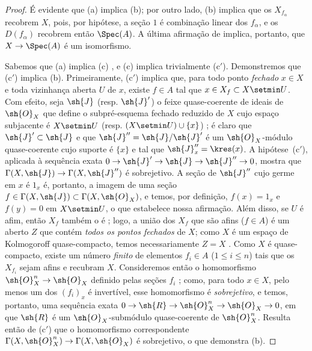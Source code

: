 \documentclass[oneside,10pt]{amsart}
\makeatletter
\renewcommand{\leq}{\leqslant}
\newcommand{\ega@arrow}[2]{\mathchoice{#1}{#2}{#2}{#2}}
\renewcommand{\to}{\ega@arrow{\longrightarrow}{\rightarrow}}
\newcommand{\oldpage}[2][]{\marginnote{\normalfont\footnotesize\textbf{#1}~|~#2}\ignorespaces}
\makeatother
\begin{document}
\begin{proof}
É evidente que (a) implica (b);
por outro lado, (b) implica que os $X_{f_\alpha}$ recobrem $X$, pois, por hipótese, a seção $1$ é combinação linear dos $f_\alpha$, e os $D(f_\alpha)$ recobrem então $\Spec(A)$.
A última afirmação de  implica, portanto, que $X\to\Spec(A)$ é um isomorfismo.

Sabemos que (a) implica (c) , e (c) implica trivialmente (c$'$).
Demonstremos que (c$'$) implica (b).
Primeiramente, (c$'$) implica que, para todo ponto \emph{fechado} $x\in X$ e toda vizinhança aberta $U$ de $x$, existe $f\in A$ tal que $x\in X_f\subset X\setmin U$.
Com efeito, seja $\sh{J}$ (resp. $\sh{J}'$) o feixe quase-coerente de ideais de $\sh{O}_X$ que define o subpré-esquema fechado reduzido de $X$ cujo espaço subjacente é $X\setmin U$ (resp. $(X\setmin U)\cup\{x\}$) ;
é claro que $\sh{J}'\subset\sh{J}$ e que $\sh{J}''=\sh{J}/\sh{J}'$ é um $\sh{O}_X$-módulo quase-coerente cujo suporte é $\{x\}$ e tal que $\sh{J}_x''=\kres(x)$.
A hipótese~(c$'$), aplicada à sequência exata $0\to\sh{J}'\to\sh{J}\to\sh{J}''\to0$, mostra que $\Gamma(X,\sh{J})\to\Gamma(X,\sh{J}'')$ é sobrejetivo.
A seção de $\sh{J}''$ cujo germe em $x$ é $1_x$ é, portanto, a imagem de uma seção $f\in\Gamma(X,\sh{J})\subset\Gamma(X,\sh{O}_X)$, e temos, por definição, $f(x)=1_x$ e $f(y)=0$ em $X\setmin U$, o que estabelece nossa afirmação.
Além disso, se $U$ é afim, então $X_f$ também o é ; logo, a união dos $X_f$ que são afins ($f\in A$) é um aberto $Z$ que contém \emph{todos os pontos fechados} de $X$;
como $X$ é um espaço de Kolmogoroff quase-compacto, temos necessariamente $Z=X$ .
Como $X$ é quase-compacto, existe um número \emph{finito} de elementos $f_i\in A$ ($1\leq i\leq n$) tais que os $X_{f_i}$ sejam afins e recubram $X$.
Consideremos então o homomorfismo $\sh{O}_X^n\to\sh{O}_X$ definido pelas seções $f_i$ ;
como, para todo $x\in X$, pelo menos um dos $(f_i)_x$ é invertível, esse homomorfismo é \emph{sobrejetivo}, e temos, portanto, uma sequência exata $0\to\sh{R}\to\sh{O}_X^n\to\sh{O}_X\to0$, em que $\sh{R}$ é um $\sh{O}_X$-submódulo quase-coerente de $\sh{O}_X^n$.
Resulta então
\oldpage[II]{98}
de (c$'$) que o homomorfismo correspondente $\Gamma(X,\sh{O}_X^n)\to\Gamma(X,\sh{O}_X)$ é sobrejetivo, o que demonstra (b).


\end{proof}
\end{document}
